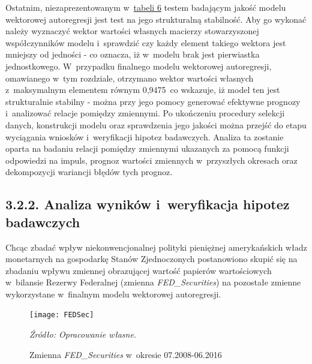Ostatnim, niezaprezentowanym w~\hyperlink{tab5}{tabeli 6} testem badającym jakość modelu wektorowej autoregresji jest test na jego strukturalną stabilność. Aby go wykonać należy wyznaczyć wektor wartości własnych macierzy stowarzyszonej współczynników modelu i~sprawdzić czy każdy element takiego wektora jest mniejszy od jedności - co oznacza, iż w~modelu brak jest pierwiastka jednostkowego. W~przypadku finalnego modelu wektorowej autoregresji, omawianego w~tym rozdziale, otrzymano wektor wartości własnych z~maksymalnym elementem równym 0,9475~co wskazuje, iż model ten jest strukturalnie stabilny - można przy jego pomocy generować efektywne prognozy i~analizować relacje pomiędzy zmiennymi. Po ukończeniu procedury selekcji danych, konstrukcji modelu oraz sprawdzenia jego jakości można przejść do etapu wyciągania wniosków i~weryfikacji hipotez badawczych. Analiza ta zostanie oparta na badaniu relacji pomiędzy zmiennymi ukazanych za pomocą funkcji odpowiedzi na impuls, prognoz wartości zmiennych w~przyszłych okresach oraz dekompozycji wariancji błędów tych prognoz.
 
\subsection*{\normalsize{3.2.2. Analiza wyników i~weryfikacja hipotez badawczych}}
\vspace{0.4cm}

Chcąc zbadać wpływ niekonwencjonalnej polityki pieniężnej amerykańskich władz monetarnych na gospodarkę Stanów Zjednoczonych postanowiono skupić się na zbadaniu wpływu zmiennej obrazującej wartość papierów wartościowych w~bilansie Rezerwy Federalnej (zmienna \textit{FED_Securities}) na pozostałe zmienne wykorzystane w~finalnym modelu wektorowej autoregresji. 

\hypertarget{fig13}{}
\begin{figure}[h]
\begin{centering}
  \texttt{[image: FEDSec]}
    \captionsetup{format=hang}
    \caption{Zmienna \textit{FED_Securities} w~okresie 07.2008-06.2016}
\end{centering}
\begin{flushleft}
\hspace{1cm}\textit{\footnotesize{Źródło: Opracowanie własne.}} \\
\end{flushleft}
\vspace{-0.5cm}
\end{figure}

